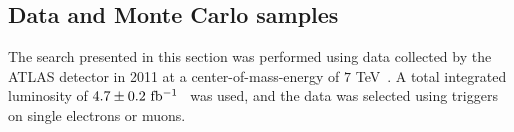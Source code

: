 

\subsection{Data and Monte Carlo samples}\label{sect:samples}

The search presented in this section was performed using data collected by the ATLAS detector in 2011 at a center-of-mass-energy of $7$ TeV~\cite{1748-0221-3-08-S08003}.
A total integrated luminosity of $4.7\pm0.2~\mbox{fb$^{-1}$}{}$~\cite{Aad:2011dr,ATLAS-CONF-2011-116} was used, and the data was selected using triggers on single electrons or muons.




